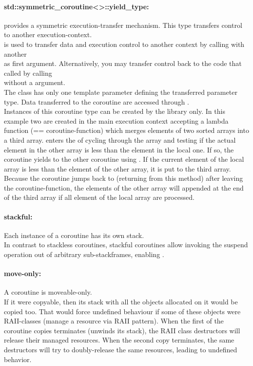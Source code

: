 \paragraph*{std::symmetric\_coroutine<>::yield\_type:}
provides a symmetric execution-transfer mechanism. This type transfers control
to another execution-context.\\
\yieldcoroop is used to transfer data and execution control to another context
by calling \yieldcoroop with another\\
\callcoro as first argument. Alternatively, you may transfer control back to the
code that called \callcoroop by calling\\
\yieldcoroop without a \callcoro argument.\\
\newline
The class has only one template parameter defining the transferred parameter
type. Data transferred to the coroutine are accessed through \yieldcoroget.\\
\newline
Instances of this coroutine type can be created by the library only.
In this example two \callcoro are created in the main execution context
accepting a lambda function (== coroutine-function) which merges elements of two
sorted arrays into a third array.  enters the \corofunction of
 cycling through the array and testing if the actual element in the
other array is less than the element in the local one. If so, the coroutine
yields to the other coroutine  using . If the
current element of the local array is less than the element of the other array,
it is put to the third array. Because the coroutine jumps back to 
(returning from this method) after leaving the coroutine-function, the elements
of the other array will appended at the end of the third array if all element of
the local array are processed. 

\paragraph*{stackful:}
Each instance of a coroutine has its own stack.\\
\newline
In contrast to stackless coroutines, stackful coroutines allow invoking the
suspend operation out of arbitrary sub-stackframes, enabling \escreops.

\paragraph*{move-only:}
A coroutine is moveable-only.\\
\newline
If it were copyable, then its stack with all the objects allocated on it
would be copied too. That would force undefined behaviour if some of these objects
were RAII-classes (manage a resource via RAII pattern). When the first of the
coroutine copies terminates (unwinds its stack), the RAII class destructors will
release their managed resources. When the second copy terminates, the same
destructors will try to doubly-release the same resources, leading to undefined
behavior.

